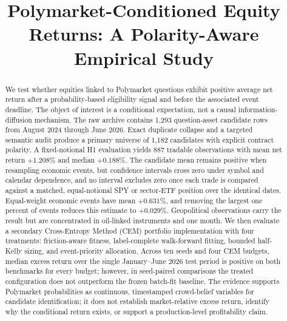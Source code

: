 \documentclass[sigconf,anonymous]{acmart}
\begin{document}
\title{Polymarket-Conditioned Equity Returns: A Polarity-Aware Empirical Study}

\begin{abstract}
We test whether equities linked to Polymarket questions exhibit positive average net return after a probability-based eligibility signal and before the associated event deadline. The object of interest is a conditional expectation, not a causal information-diffusion mechanism. The raw archive contains 1,293 question-asset candidate rows from August 2024 through June 2026. Exact duplicate collapse and a targeted semantic audit produce a primary universe of 1,182 candidates with explicit contract polarity. A fixed-notional H1 evaluation yields 887 tradable observations with mean net return $+1.208\%$ and median $+0.188\%$. The candidate mean remains positive when resampling economic events, but confidence intervals cross zero under symbol and calendar dependence, and no interval excludes zero once each trade is compared against a matched, equal-notional SPY or sector-ETF position over the identical dates. Equal-weight economic events have mean $+0.631\%$, and removing the largest one percent of events reduces this estimate to $+0.029\%$. Geopolitical observations carry the result but are concentrated in oil-linked instruments and one month. We then evaluate a secondary Cross-Entropy Method (CEM) portfolio implementation with four treatments: friction-aware fitness, label-complete walk-forward fitting, bounded half-Kelly sizing, and event-priority allocation. Across ten seeds and four CEM budgets, median excess return over the single January--June 2026 test period is positive on both benchmarks for every budget; however, in seed-paired comparisons the treated configuration does not outperform the frozen batch-fit baseline. The evidence supports Polymarket probabilities as continuous, timestamped crowd-belief variables for candidate identification; it does not establish market-relative excess return, identify why the conditional return exists, or support a production-level profitability claim.
\end{abstract}


\maketitle
\end{document}
